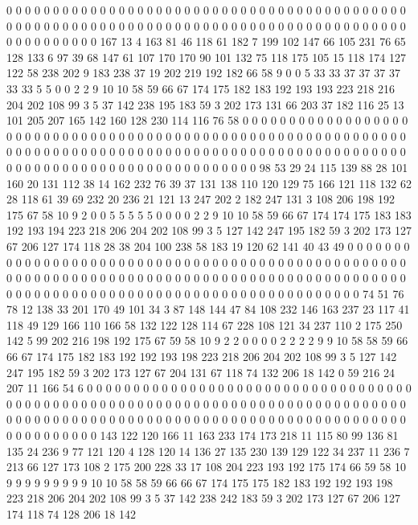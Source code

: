 0 0 0 0 0 0 0 0 0 0 0 0 0 0 0 0 0 0 0 0
0 0 0 0 0 0 0 0 0 0 0 0 0 0 0 0 0 0 0 0
0 0 0 0 0 0 0 0 0 0 0 0 0 0 0 0 0 0 0 0
0 0 0 0 0 0 0 0 0 0 0 0 0 0 0 0 0 0 0 0
0 0 0 0 0 0 0 0 0 0 0 0 0 0 0 0 167 13 4 163
81 46 118 61 182 7 199 102 147 66 105 231 76 65 128 133 6 97 39 68
147 61 107 170 170 90 101 132 75 118 175 105 15 118 174 127 122 58 238 202
9 183 238 37 19 202 219 192 182 66 58 9 0 0 5 33 33 37 37 37
37 33 33 5 5 0 0 2 2 9 10 10 58 59 66 67 174 175 182 183
192 193 193 223 218 216 204 202 108 99 3 5 37 142 238 195 183 59 3 202
173 131 66 203 37 182 116 25 13 101 205 207 165 142 160 128 230 114 116 76
58 0 0 0 0 0 0 0 0 0 0 0 0 0 0 0 0 0 0 0
0 0 0 0 0 0 0 0 0 0 0 0 0 0 0 0 0 0 0 0
0 0 0 0 0 0 0 0 0 0 0 0 0 0 0 0 0 0 0 0
0 0 0 0 0 0 0 0 0 0 0 0 0 0 0 0 0 0 0 0
0 0 0 0 0 0 0 0 0 0 0 0 0 0 0 0 0 0 0 0
0 0 0 0 0 0 0 0 0 0 0 0 0 0 0 0 0 0 0 0
0 0 0 0 0 0 0 0 0 0 0 0 98 53 29 24 115 139 88 28
101 160 20 131 112 38 14 162 232 76 39 37 131 138 110 120 129 75 166 121
118 132 62 28 118 61 39 69 232 20 236 21 121 13 247 202 2 182 247 131
3 108 206 198 192 175 67 58 10 9 2 0 0 5 5 5 5 5 0 0
0 0 2 2 9 10 10 58 59 66 67 174 174 175 183 183 192 193 194 223
218 206 204 202 108 99 3 5 127 142 247 195 182 59 3 202 173 127 67 206
127 174 118 28 38 204 100 238 58 183 19 120 62 141 40 43 49 0 0 0
0 0 0 0 0 0 0 0 0 0 0 0 0 0 0 0 0 0 0 0
0 0 0 0 0 0 0 0 0 0 0 0 0 0 0 0 0 0 0 0
0 0 0 0 0 0 0 0 0 0 0 0 0 0 0 0 0 0 0 0
0 0 0 0 0 0 0 0 0 0 0 0 0 0 0 0 0 0 0 0
0 0 0 0 0 0 0 0 0 0 0 0 0 0 0 0 0 0 0 0
0 0 0 0 0 0 0 0 0 0 0 0 0 0 0 0 0 0 0 0
0 0 0 0 0 0 0 0 74 51 76 78 12 138 33 201 170 49 101 34
3 87 148 144 47 84 108 232 146 163 237 23 117 41 118 49 129 166 110 166
58 132 122 128 114 67 228 108 121 34 237 110 2 175 250 142 5 99 202 216
198 192 175 67 59 58 10 9 2 2 0 0 0 0 2 2 2 2 9 9
10 58 58 59 66 66 67 174 175 182 183 192 192 193 198 223 218 206 204 202
108 99 3 5 127 142 247 195 182 59 3 202 173 127 67 204 131 67 118 74
132 206 18 142 0 59 216 24 207 11 166 54 6 0 0 0 0 0 0 0
0 0 0 0 0 0 0 0 0 0 0 0 0 0 0 0 0 0 0 0
0 0 0 0 0 0 0 0 0 0 0 0 0 0 0 0 0 0 0 0
0 0 0 0 0 0 0 0 0 0 0 0 0 0 0 0 0 0 0 0
0 0 0 0 0 0 0 0 0 0 0 0 0 0 0 0 0 0 0 0
0 0 0 0 0 0 0 0 0 0 0 0 0 0 0 0 0 0 0 0
0 0 0 0 0 0 0 0 0 0 0 0 0 0 0 0 0 0 0 0
0 0 0 0 143 122 120 166 11 163 233 174 173 218 11 115 80 99 136 81
135 24 236 9 77 121 120 4 128 120 14 136 27 135 230 139 129 122 34 237
11 236 7 213 66 127 173 108 2 175 200 228 33 17 108 204 223 193 192 175
174 66 59 58 10 9 9 9 9 9 9 9 9 9 10 10 58 58 59 66
66 67 174 175 175 182 183 192 192 193 198 223 218 206 204 202 108 99 3 5
37 142 238 242 183 59 3 202 173 127 67 206 127 174 118 74 128 206 18 142

